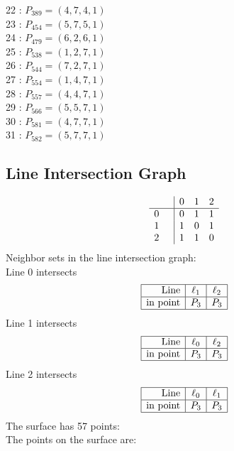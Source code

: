\documentclass{article}
\begin{document}
{\begin{multicols}{2}
22 : $P_{389}=( 4, 7, 4, 1 )$\\
23 : $P_{454}=( 5, 7, 5, 1 )$\\
24 : $P_{479}=( 6, 2, 6, 1 )$\\
25 : $P_{538}=( 1, 2, 7, 1 )$\\
26 : $P_{544}=( 7, 2, 7, 1 )$\\
27 : $P_{554}=( 1, 4, 7, 1 )$\\
28 : $P_{557}=( 4, 4, 7, 1 )$\\
29 : $P_{566}=( 5, 5, 7, 1 )$\\
30 : $P_{581}=( 4, 7, 7, 1 )$\\
31 : $P_{582}=( 5, 7, 7, 1 )$\\
\end{multicols}
\subsection*{Line Intersection Graph}
{\arraycolsep=1pt
$$
\begin{array}{rr|*{3}r}
 &  & 0 & 1 & 2\\
\hline
0 &  & 0 & 1 & 1\\
1 &  & 1 & 0 & 1\\
2 &  & 1 & 1 & 0\\
\end{array}
$$
}%
Neighbor sets in the line intersection graph:\\
Line 0 intersects 
$$
\begin{array}{|r*{2}{|c}|}
\hline
\mbox{Line}  & \ell_{1} & \ell_{2}\\
\hline
\mbox{in point}  & P_{3} & P_{3}\\
\hline
\end{array}
$$
Line 1 intersects 
$$
\begin{array}{|r*{2}{|c}|}
\hline
\mbox{Line}  & \ell_{0} & \ell_{2}\\
\hline
\mbox{in point}  & P_{3} & P_{3}\\
\hline
\end{array}
$$
Line 2 intersects 
$$
\begin{array}{|r*{2}{|c}|}
\hline
\mbox{Line}  & \ell_{0} & \ell_{1}\\
\hline
\mbox{in point}  & P_{3} & P_{3}\\
\hline
\end{array}
$$
The surface has 57 points:\\
The points on the surface are:\\
\begin{multicols}{3}

\end{multicols}}
\end{document}
